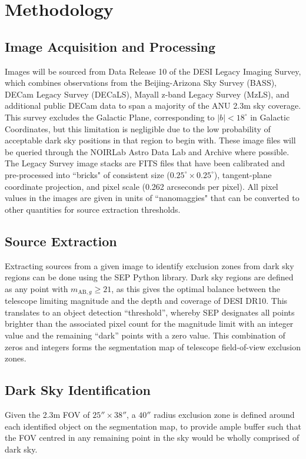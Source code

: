 \documentclass[11pt]{article}
\begin{document}
\section{Methodology}

\subsection{Image Acquisition and Processing}

Images will be sourced from Data Release 10 of the DESI Legacy Imaging Survey, which combines observations from the Beijing-Arizona Sky Survey (BASS), DECam Legacy Survey (DECaLS), Mayall z-band Legacy Survey (MzLS), and additional public DECam data to span a majority of the ANU 2.3m sky coverage. This survey excludes the Galactic Plane, corresponding to $|b|<18 ^\circ$ in Galactic Coordinates, but this limitation is negligible due to the low probability of acceptable dark sky positions in that region to begin with. These image files will be queried through the NOIRLab Astro Data Lab and Archive where possible. \\

The Legacy Survey image stacks are FITS files that have been calibrated and pre-processed into ``bricks" of consistent size ($0.25^\circ\times 0.25^\circ$), tangent-plane coordinate projection, and pixel scale (0.262 arcseconds per pixel). All pixel values in the images are given in units of ``nanomaggies" that can be converted to other quantities for source extraction thresholds.

\subsection{Source Extraction}
Extracting sources from a given image to identify exclusion zones from dark sky regions can be done using the SEP Python library. Dark sky regions are defined as any point with $m_{\text{AB},g}\geq21$, as this gives the optimal balance between the telescope limiting magnitude \cite{dopita_observing_nodate} and the depth and coverage of DESI DR10. This translates to an object detection ``threshold'', whereby SEP designates all points brighter than the associated pixel count for the magnitude limit with an integer value and the remaining ``dark'' points with a zero value. This combination of zeros and integers forms the segmentation map of telescope field-of-view exclusion zones.

\subsection{Dark Sky Identification}
Given the 2.3m FOV of $25''\times38''$, a $40''$ radius exclusion zone is defined around each identified object on the segmentation map, to provide ample buffer such that the FOV centred in any remaining point in the sky would be wholly comprised of dark sky. \\
\end{document}
